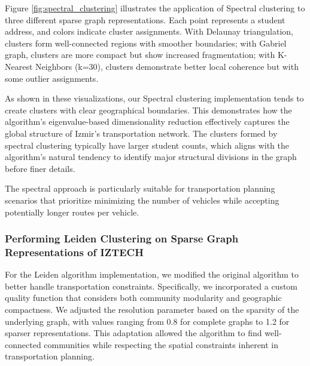 Figure \ref{fig:spectral_clustering} illustrates the application of Spectral clustering to three different sparse graph representations. Each point represents a student address, and colors indicate cluster assignments. With Delaunay triangulation, clusters form well-connected regions with smoother boundaries; with Gabriel graph, clusters are more compact but show increased fragmentation; with K-Nearest Neighbors (k=30), clusters demonstrate better local coherence but with some outlier assignments.

As shown in these visualizations, our Spectral clustering implementation tends to create clusters with clear geographical boundaries. This demonstrates how the algorithm's eigenvalue-based dimensionality reduction effectively captures the global structure of Izmir's transportation network. The clusters formed by spectral clustering typically have larger student counts, which aligns with the algorithm's natural tendency to identify major structural divisions in the graph before finer details.

The spectral approach is particularly suitable for transportation planning scenarios that prioritize minimizing the number of vehicles while accepting potentially longer routes per vehicle.

\subsubsection{Performing Leiden Clustering on Sparse Graph Representations of IZTECH}
\label{subsubsec:leiden_implementation}

For the Leiden algorithm implementation, we modified the original algorithm to better handle transportation constraints. Specifically, we incorporated a custom quality function that considers both community modularity and geographic compactness. We adjusted the resolution parameter based on the sparsity of the underlying graph, with values ranging from 0.8 for complete graphs to 1.2 for sparser representations. This adaptation allowed the algorithm to find well-connected communities while respecting the spatial constraints inherent in transportation planning.

